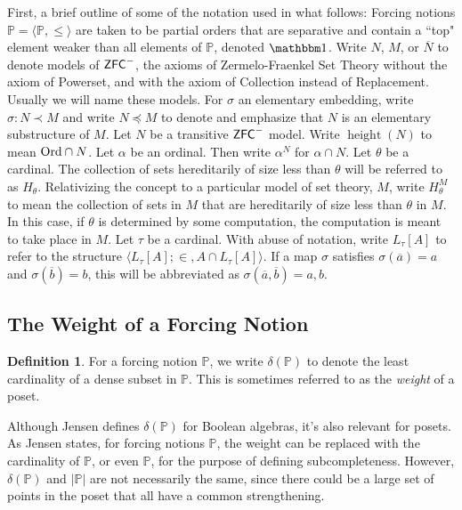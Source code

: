 \documentclass{amsart}
\theoremstyle{definition}
\newtheorem{definition}[theorem]{Definition}
\theoremstyle{remark}
\renewcommand{\P}{\mathbb{P}}
\newcommand{\N}{{\overline{N}}}
\newcommand{\ZFC}{\textup{\ensuremath{\textsf{ZFC}}}}
\newcommand{\Ord}{\textup{\ensuremath{\text{Ord}}}}
\DeclareMathOperator{\height}{height}
\begin{document}
First, a brief outline of some of the notation used in what follows:
Forcing notions $\P = \langle \P, \leq \rangle$ are taken to be partial orders that are separative and contain a ``top" element weaker than all elements of $\P$, denoted $\mathbbm 1$.
Write $N$, $M$, or $\N$ to denote models of $\ZFC^-$, the axioms of Zermelo-Fraenkel Set Theory without the axiom of \textsf{Powerset}, and with the axiom of \textsf{Collection} instead of \textsf{Replacement}. Usually we will name these models. For $\sigma$ an elementary embedding, write $\sigma: N \prec M$ and write $N \preccurlyeq M$ to denote and emphasize that $N$ is an elementary substructure of $M$. 
Let $N$ be a transitive $\ZFC^-$ model. Write $\height(N)$ to mean $\Ord \cap N$. Let $\alpha$ be an ordinal. Then write $\alpha^N$ for $\alpha \cap N$.
Let $\theta$ be a cardinal. The collection of sets hereditarily of size less than $\theta$ will be referred to as $H_\theta$. Relativizing the concept to a particular model of set theory, $M$, write $H_\theta^M$ to mean the collection of sets in $M$ that are hereditarily of size less than $\theta$ in $M$. In this case, if $\theta$ is determined by some computation, the computation is meant to take place in $M$.
Let $\tau$ be a cardinal. With abuse of notation, write $L_\tau[A]$ to refer to the structure $\langle L_\tau[A]; \in, A \cap L_\tau[A] \rangle$. 
If a map $\sigma$ satisfies $\sigma(\overline a)=a$ and $\sigma(\overline b)=b$, this will be abbreviated as $\sigma(\overline a,\overline b)=a,b$.


\subsection{The Weight of a Forcing Notion}
\label{subsec:delta}

\begin{definition} For a forcing notion $\P$, we write $\delta(\P)$ to denote the least cardinality of a dense subset in $\P$. This is sometimes referred to as the \emph{weight} of a poset. \end{definition}

Although Jensen defines $\delta(\P)$ for Boolean algebras, it's also relevant for posets. As Jensen states, for forcing notions $\P$, the weight can be replaced with the cardinality of $\P$, or even $\P$, for the purpose of defining subcompleteness. However, $\delta(\P)$ and $|\P|$ are not necessarily the same, since there could be a large set of points in the poset that all have a common strengthening. 
\end{document}
